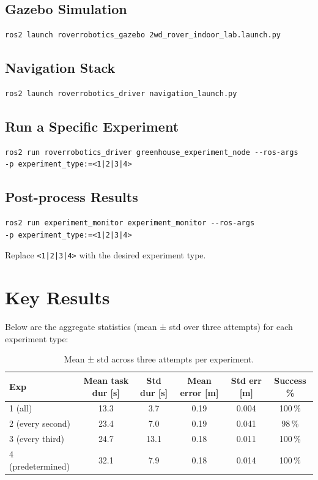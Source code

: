 \documentclass[11pt]{article}
\begin{document}
\subsection{Gazebo Simulation}
\begin{verbatim}
ros2 launch roverrobotics_gazebo 2wd_rover_indoor_lab.launch.py
\end{verbatim}

\subsection{Navigation Stack}
\begin{verbatim}
ros2 launch roverrobotics_driver navigation_launch.py
\end{verbatim}

\subsection{Run a Specific Experiment}
\begin{verbatim}
ros2 run roverrobotics_driver greenhouse_experiment_node --ros-args
-p experiment_type:=<1|2|3|4>
\end{verbatim}

\subsection{Post-process Results}
\begin{verbatim}
ros2 run experiment_monitor experiment_monitor --ros-args
-p experiment_type:=<1|2|3|4>
\end{verbatim}

Replace \texttt{<1|2|3|4>} with the desired experiment type.

\section{Key Results}
Below are the aggregate statistics (mean ± std over three attempts) for each experiment type:


\begin{table}[H]
\centering
\begin{tabular}{@{}lccccc@{}}
\toprule
\textbf{Exp} & \textbf{Mean task dur [s]} & \textbf{Std dur [s]} 
            & \textbf{Mean error [m]}  & \textbf{Std err [m]} & \textbf{Success \%} \\
\midrule
1 (all)           & 13.3  & 3.7  & 0.19  & 0.004 & 100\,\% \\
2 (every second)  & 23.4  & 7.0  & 0.19  & 0.041 &  98\,\% \\
3 (every third)   & 24.7  & 13.1 & 0.18  & 0.011 & 100\,\% \\
4 (predetermined) & 32.1  & 7.9  & 0.18  & 0.014 & 100\,\% \\
\bottomrule
\end{tabular}
\caption{Mean ± std across three attempts per experiment.}
\end{table}
\end{document}

